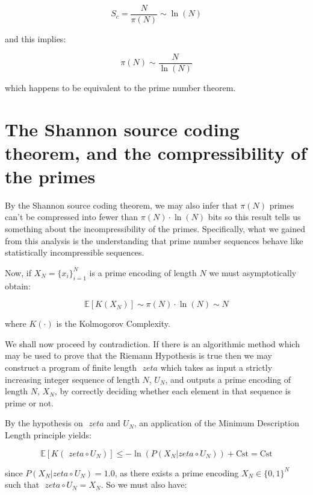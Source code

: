 \documentclass{article}
\begin{document}
\begin{equation}
S_c = \frac{N}{\pi(N)} \sim \ln(N)
\end{equation}

and this implies:

\begin{equation}
\pi(N) \sim \frac{N}{\ln(N)}
\end{equation}

which happens to be equivalent to the prime number theorem.

\newpage 

\section{The Shannon source coding theorem, and the compressibility of the primes}

By the Shannon source coding theorem, we may also infer that $\pi(N)$ primes can't be compressed into fewer than $\pi(N) \cdot \ln(N)$ bits so this result tells us something about the incompressibility of the primes. Specifically, what we gained from this analysis is the understanding that prime number sequences behave like statistically incompressible sequences.

Now, if $X_N = \{x_i\}_{i=1}^N$ is a prime encoding of length $N$ we must asymptotically obtain:

\begin{equation}
\mathbb{E}[K(X_N)] \sim \pi(N) \cdot \ln(N) \sim N
\end{equation}

where $K(\cdot)$ is the Kolmogorov Complexity.

We shall now proceed by contradiction. If there is an algorithmic method which may be used to prove that the Riemann Hypothesis is true then we may construct a program of finite length $\textit{ zeta}$ which takes as input a strictly increasing integer sequence of length $N$, $U_N$, and outputs a prime encoding of length $N$, $X_N$, by correctly deciding whether each element in that sequence is prime or not.

By the hypothesis on $\textit{ zeta}$ and $U_N$, an application of the Minimum Description Length principle yields:

\begin{equation}
\mathbb{E}[K(\textit{ zeta} \circ U_N)] \leq -\ln(P(X_N \lvert \textit{zeta} \circ U_N)) + \text{Cst} = \text{Cst} 	
\end{equation}

since $P(X_N \lvert \textit{zeta} \circ U_N) = 1.0$, as there exists a prime encoding $X_N \in \{0,1\}^N$ such that $\textit{ zeta} \circ U_N = X_N$. So we must also have:
\end{document}
